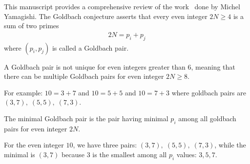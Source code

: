 This manuscript provides a comprehensive review of the work~\cite{yamagishi2025goldbach} done by Michel Yamagishi.
The Goldbach conjecture asserts that every even integer $2N \geq 4$ is a sum of two primes
\begin{align*}
    2N = p_i + p_j
\end{align*}
where $(p_i, p_j)$ is called a Goldbach pair.

A Goldbach pair is not unique for even integers greater than 6,
meaning that there can be multiple Goldbach pairs for even integer $2N \geq 8$.

For example: $10=3+7$ and $10=5+5$ and $10=7+3$ where goldbach pairs are $(3,7), \; (5,5), \; (7,3)$.

The minimal Goldbach pair is the pair having minimal $p_i$ among all goldbach pairs for even integer $2N$.

For the even integer $10$, we have three pairs: $(3,7), \; (5,5), \; (7,3)$, while the minimal is $(3,7)$ because
$3$ is the smallest among all $p_i$ values: $3, 5, 7$.


